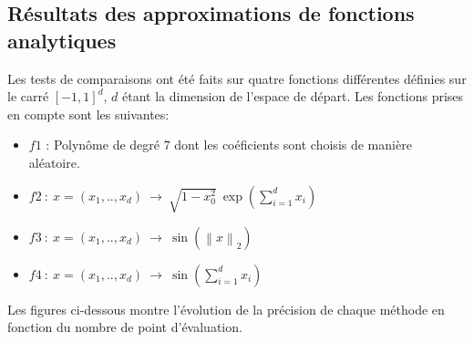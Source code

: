 \subsection{Résultats des approximations de fonctions analytiques}
Les tests de comparaisons ont été faits sur quatre fonctions différentes définies sur le carré $\left [ -1,1 \right ] ^d$, $d$ étant la dimension de l'espace de départ.
Les fonctions prises en compte sont les suivantes:
\begin{itemize}
	\item $f1$ : Polynôme de degré $7$ dont les coéficients sont choisis de manière aléatoire.
	\item $f2\ :\ x=(x_1,..,x_d)\ \rightarrow \ \sqrt{1-x_0^2}\ \exp(\sum_{i=1}^dx_i)$
	\item $f3\ :\ x=(x_1,..,x_d)\ \rightarrow \ \sin(\left \| x \right \|_2)$
	\item $f4\ :\ x=(x_1,..,x_d)\ \rightarrow \ \sin(\sum_{i=1}^dx_i)$
\end{itemize}

Les figures ci-dessous montre l'évolution de la précision de chaque méthode en fonction du nombre de point d'évaluation.

